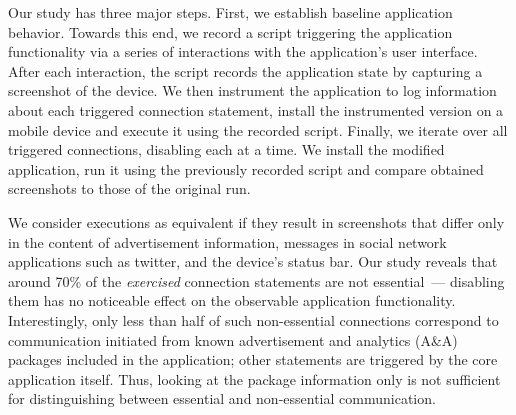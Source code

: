 Our study has three major steps. First, we establish baseline
application behavior.  Towards this end, we record a
script triggering the application functionality via a series of
interactions with the application's user interface.  After each
interaction, the script records the
application state by capturing a screenshot of the device.
We then instrument the application to log information
about each triggered connection statement, install the instrumented version on a mobile device and execute it using the recorded script.
Finally, we iterate over all triggered connections, disabling each at a time.
%
We install the modified
application, run it using the previously recorded script and compare obtained screenshots 
to those of the original run. 

We consider executions as
equivalent if they result in screenshots that differ only in the
content of advertisement information, messages in social network
applications such as twitter, and the device's status bar.  
Our study reveals that around 70\% of
the \emph{exercised} connection statements are not essential~--- disabling
them has no noticeable effect on the observable application
functionality. Interestingly, only less than half of such non-essential connections correspond to communication initiated from known advertisement and analytics (A\&A) packages included in the application; other statements are triggered by the core application itself. 
Thus, looking at the package information only is not sufficient for distinguishing between
essential and non-essential communication. 

